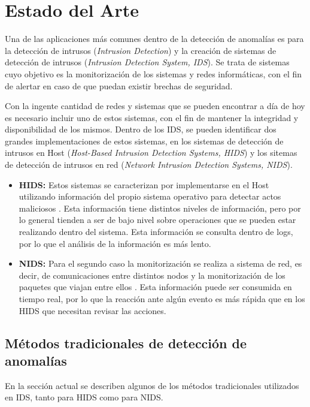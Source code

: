 \chapter{Estado del Arte}
\label{chapter:Estado del Arte}

Una de las aplicaciones más comunes dentro de la detección de anomalías es para la detección de intrusos (\textit{Intrusion Detection}) y la creación de sistemas de detección de intrusos (\textit{Intrusion Detection System, IDS}). Se trata de sistemas cuyo objetivo es la monitorización de los sistemas y redes informáticas, con el fin de alertar en caso de que puedan existir brechas de seguridad\cite{intrusionSystems}. 

Con la ingente cantidad de redes y sistemas que se pueden encontrar a día de hoy es necesario incluir uno de estos sistemas, con el fin de mantener la integridad y disponibilidad de los mismos. Dentro de los IDS, se pueden identificar dos grandes implementaciones de estos sistemas, en los sistemas de detección de intrusos en Host (\textit{Host-Based Intrusion Detection Systems, HIDS}) y los sitemas de detección de intrusos en red (\textit{Network Intrusion Detection Systems, NIDS}).

\begin{itemize}
    \item \textbf{HIDS:} Estos sistemas se caracterizan por implementarse en el Host utilizando información del propio sistema operativo para detectar actos maliciosos \cite{HIDS}. Esta información tiene distintos niveles de información, pero por lo general tienden a ser de bajo nivel sobre operaciones que se pueden estar realizando dentro del sistema. Esta información se consulta dentro de logs, por lo que el análisis de la información es más lento.
   \item \textbf{NIDS:} Para el segundo caso la monitorización se realiza a sistema de red, es decir, de comunicaciones entre distintos nodos y la monitorización de los paquetes que viajan entre ellos \cite{intrusionSystems}. Esta información puede ser consumida en tiempo real, por lo que la reacción ante algún evento es más rápida que en los HIDS que necesitan revisar las acciones.
\end{itemize}

\section{Métodos tradicionales de detección de anomalías}
En la sección actual se describen algunos de los métodos tradicionales utilizados en IDS, tanto para HIDS como para NIDS.

